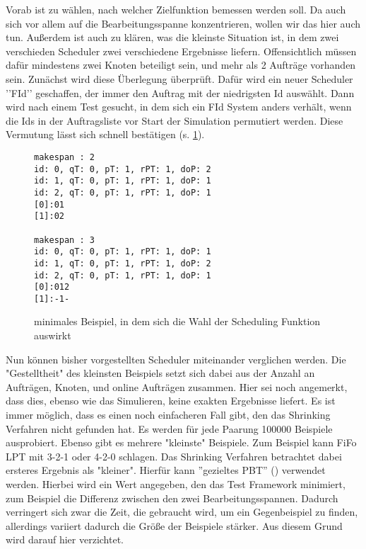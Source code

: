 Vorab ist zu wählen, nach welcher Zielfunktion bemessen werden soll. Da auch \cite{Arn99} sich vor allem auf die Bearbeitungsspanne konzentrieren, wollen wir das hier auch tun. Außerdem ist auch zu klären, was die kleinste Situation ist, in dem zwei verschieden Scheduler zwei verschiedene Ergebnisse liefern. Offensichtlich müssen dafür mindestens zwei Knoten beteiligt sein, und mehr als 2 Aufträge vorhanden sein. Zunächst wird diese Überlegung überprüft. Dafür wird ein neuer Scheduler ’’FId’’ geschaffen, der immer den Auftrag mit der niedrigsten Id auswählt. Dann wird nach einem Test gesucht, in dem sich ein FId System anders verhält, wenn die Ids in der Auftragsliste vor Start der Simulation permutiert werden. Diese Vermutung lässt sich schnell bestätigen (s. \ref{minX}).\\
\begin{figure}
\centering
\begin{verbatim}
makespan : 2
id: 0, qT: 0, pT: 1, rPT: 1, doP: 2
id: 1, qT: 0, pT: 1, rPT: 1, doP: 1
id: 2, qT: 0, pT: 1, rPT: 1, doP: 1
[0]:01
[1]:02

makespan : 3
id: 0, qT: 0, pT: 1, rPT: 1, doP: 1
id: 1, qT: 0, pT: 1, rPT: 1, doP: 2
id: 2, qT: 0, pT: 1, rPT: 1, doP: 1
[0]:012
[1]:-1-
\end{verbatim}
\caption{minimales Beispiel, in dem sich die Wahl der Scheduling Funktion auswirkt}
\label{minX}
\end{figure}

Nun können bisher vorgestellten Scheduler miteinander verglichen werden. Die "Gestelltheit" des kleinsten Beispiels setzt sich dabei aus der Anzahl an Aufträgen, Knoten, und online Aufträgen zusammen. Hier sei noch angemerkt, dass dies, ebenso wie das Simulieren, keine exakten Ergebnisse liefert. Es ist immer möglich, dass es einen noch einfacheren Fall gibt, den das Shrinking Verfahren nicht gefunden hat. Es werden für jede Paarung 100000 Beispiele ausprobiert. Ebenso gibt es mehrere "kleinste" Beispiele. Zum Beispiel kann FiFo LPT mit 
3-2-1 oder 4-2-0 schlagen. Das Shrinking Verfahren betrachtet dabei ersteres Ergebnis als "kleiner". Hierfür kann ''gezieltes PBT'' (\cite{testTarget}) verwendet werden. Hierbei wird ein Wert angegeben, den das Test Framework minimiert, zum Beispiel die Differenz zwischen den zwei Bearbeitungsspannen. Dadurch verringert sich zwar die Zeit, die gebraucht wird, um ein Gegenbeispiel zu finden, allerdings variiert dadurch die Größe der Beispiele stärker. Aus diesem Grund wird darauf hier verzichtet.\\


